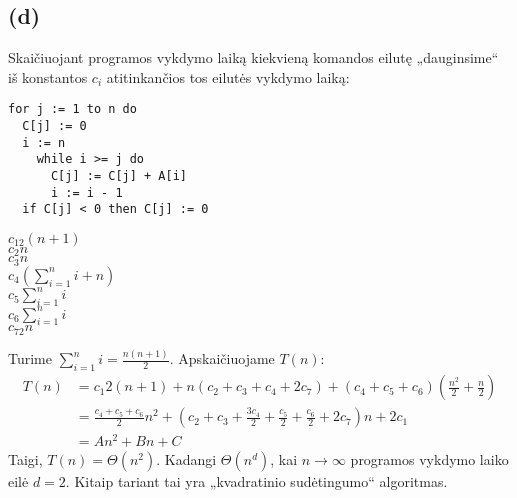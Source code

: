 \documentclass[a4paper,lithuanian]{article}
\begin{document}
\subsection*{(d)}
Skaičiuojant programos vykdymo laiką kiekvieną komandos eilutę „dauginsime“ iš konstantos $c_i$ atitinkančios tos eilutės vykdymo laiką:
\begin{multicols}{2}
  \begin{lstlisting}
for j := 1 to n do
  C[j] := 0
  i := n
    while i >= j do
      C[j] := C[j] + A[i]
      i := i - 1
  if C[j] < 0 then C[j] := 0
  \end{lstlisting}
  \columnbreak
  $c_12(n+1)$\\
  $c_2n$\\
  $c_3n$\\
  $c_4(\sum_{i=1}^{n}i + n)$\\
  $c_5\sum_{i=1}^{n}i$\\
  $c_6\sum_{i=1}^{n}i$\\
  $c_72n$\\
\end{multicols}
Turime $\sum_{i=1}^{n}i=\frac{n(n+1)}{2}$. Apskaičiuojame $T(n)$:
\begin{equation}
  \begin{aligned}
    T(n) &= c_{1}2(n+1)+n(c_2+c_3+c_4+2c_7)+(c_4+c_5+c_6)(\frac{n^2}{2}+\frac{n}{2})\\
         &= \frac{c_4+c_5+c_6}{2}n^2 + (c_2 + c_3 + \frac{3c_4}{2} + \frac{c_5}{2} + \frac{c_6}{2} + 2c_7)n + 2c_1\\
         &= An^2 + Bn + C
  \end{aligned}
\end{equation}
Taigi, $T(n) = \Theta{(n^2)}$. Kadangi $\Theta{}(n^d)$, kai $n\rightarrow{}\infty{}$ programos vykdymo laiko eilė $d = 2$. Kitaip tariant tai yra „kvadratinio sudėtingumo“ algoritmas.
\end{document}
